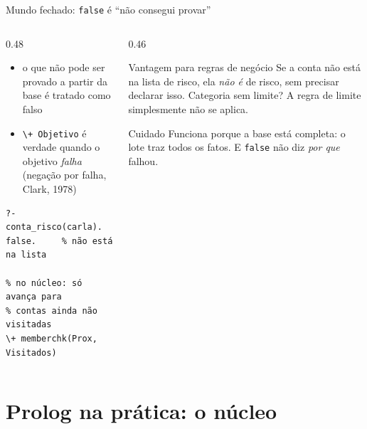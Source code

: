 \documentclass[aspectratio=169,11pt,xcolor=table]{beamer}
\begin{document}
\begin{frame}[fragile]{Mundo fechado: \texttt{false} é ``não consegui provar''}
  \begin{columns}[T]
    \begin{column}{0.48\textwidth}
      \small
      \begin{itemize}
        \item o que não pode ser provado a partir da base é tratado como falso
        \item \texttt{\textbackslash+ Objetivo} é verdade quando o objetivo
              \emph{falha} (negação por falha, Clark, 1978)
      \end{itemize}
      \vspace{4pt}
\begin{lstlisting}[style=pl]
?- conta_risco(carla).
false.     % não está na lista

% no núcleo: só avança para
% contas ainda não visitadas
\+ memberchk(Prox, Visitados)
\end{lstlisting}
    \end{column}
    \begin{column}{0.46\textwidth}
      \begin{alertblock}{Vantagem para regras de negócio}
        \small
        Se a conta não está na lista de risco, ela \emph{não é} de risco, sem
        precisar declarar isso. Categoria sem limite? A regra de limite
        simplesmente não se aplica.
      \end{alertblock}
      \vspace{4pt}
      \begin{block}{Cuidado}
        \small
        Funciona porque a base está completa: o lote traz todos os fatos.
        E \texttt{false} não diz \emph{por que} falhou.
      \end{block}
    \end{column}
  \end{columns}
\end{frame}

\section{Prolog na prática: o núcleo}
\end{document}
